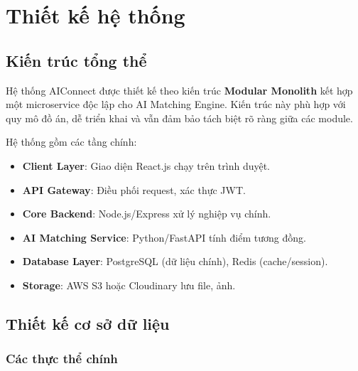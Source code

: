 \chapter{Thiết kế hệ thống}

\section{Kiến trúc tổng thể}

Hệ thống AIConnect được thiết kế theo kiến trúc \textbf{Modular
Monolith} kết hợp một microservice độc lập cho AI Matching Engine.
Kiến trúc này phù hợp với quy mô đồ án, dễ triển khai và vẫn đảm
bảo tách biệt rõ ràng giữa các module.

Hệ thống gồm các tầng chính:
\begin{itemize}
  \item \textbf{Client Layer}: Giao diện React.js chạy trên trình duyệt.
  \item \textbf{API Gateway}: Điều phối request, xác thực JWT.
  \item \textbf{Core Backend}: Node.js/Express xử lý nghiệp vụ chính.
  \item \textbf{AI Matching Service}: Python/FastAPI tính điểm tương đồng.
  \item \textbf{Database Layer}: PostgreSQL (dữ liệu chính), Redis (cache/session).
  \item \textbf{Storage}: AWS S3 hoặc Cloudinary lưu file, ảnh.
\end{itemize}

\section{Thiết kế cơ sở dữ liệu}

\subsection{Các thực thể chính}

